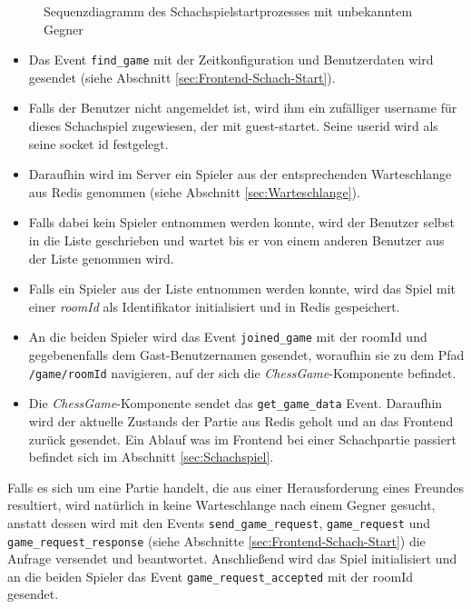 \begin{figure}[!h]
\begin{adjustbox}{width=\textwidth}
\begin{sequencediagram}[scale=0.2]
    
    
  \end{sequencediagram}
  \end{adjustbox}
  
  \caption{Sequenzdiagramm des Schachspielstartprozesses mit unbekanntem Gegner}
  \label{fig:sequence_chess_start}
\end{figure}


\begin{itemize}
\item Das Event \verb|find_game| mit der Zeitkonfiguration und Benutzerdaten wird gesendet (siehe Abschnitt \ref{sec:Frontend-Schach-Start}).
\item Falls der Benutzer nicht angemeldet ist, wird ihm  ein zufälliger username für dieses Schachspiel zugewiesen, der mit \glqq guest-\grqq{ }startet. Seine userid wird als seine socket id festgelegt.
\item Daraufhin wird im Server ein Spieler aus der entsprechenden Warteschlange aus Redis genommen (siehe Abschnitt \ref{sec:Warteschlange}).
\item Falls dabei kein Spieler entnommen werden konnte, wird der Benutzer selbst in die Liste geschrieben und wartet bis er von einem anderen Benutzer aus der Liste genommen wird.
\item Falls ein Spieler aus der Liste entnommen werden konnte, wird das Spiel mit einer \textit{roomId} als Identifikator initialisiert und in Redis gespeichert.
\item An die beiden Spieler wird das Event \verb|joined_game| mit der roomId und gegebenenfalls dem Gast-Benutzernamen gesendet, woraufhin sie zu dem Pfad \verb|/game/roomId| navigieren, auf der sich die \textit{ChessGame}-Komponente befindet.
\item Die \textit{ChessGame}-Komponente sendet das \verb|get_game_data| Event. Daraufhin wird der aktuelle Zustands der Partie aus Redis geholt und an das Frontend zurück gesendet. Ein Ablauf was im Frontend bei einer Schachpartie passiert befindet sich im Abschnitt \ref{sec:Schachspiel}.
\end{itemize}

Falls es sich um eine Partie handelt, die aus einer Herausforderung eines Freundes resultiert, wird natürlich in keine Warteschlange nach einem Gegner gesucht, anstatt dessen wird mit den Events \verb|send_game_request|, \verb|game_request| und \verb|game_request_response| (siehe Abschnitte \ref{sec:Frontend-Schach-Start}) die Anfrage versendet und beantwortet. Anschließend wird das Spiel initialisiert und an die beiden Spieler das Event \verb|game_request_accepted| mit der roomId gesendet.

